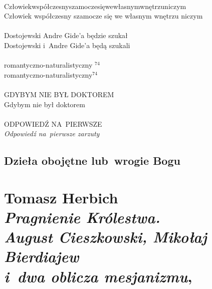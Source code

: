 \documentclass[a4paper,11pt]{article}
\numberwithin{equation}{section}
\begin{document}
\VerSpaceTwo


\noindent
{} \\
\Jest Człowiekwspółczesnyszamoczesięwewłasnymwnętrzuniczym \\
\PowinnoByc Człowiek współczesny szamocze się we własnym wnętrzu niczym \\
 \\
\Jest Dostojewski Andre Gide'a będzie szukał \\
\PowinnoByc Dostojewski i~Andre Gide'a będą szukali \\
 \\
\Jest romantyczno-naturalistyczny $^{ 74 }$ \\
\PowinnoByc romantyczno-naturalistyczny$^{ 74 }$ \\
 \\
\Jest G{\footnotesize DYBYM NIE BYŁ DOKTOREM} \\
\PowinnoByc Gdybym nie był doktorem \\
 \\
\Jest ODPOWIEDŹ NA~PIERWSZE \\
\PowinnoByc \textit{Odpowiedź na~pierwsze zarzuty} \\












\newpage

\subsection{Dzieła obojętne lub~wrogie Bogu}

\VerSpaceTwo



\section{Tomasz Herbich \\
  \textit{Pragnienie Królestwa.} \\
  \textit{August Cieszkowski, Mikołaj Bierdiajew} \\
  \textit{i~dwa oblicza mesjanizmu},
  \parencite{HerbichPragnienieKrolestwa2018}}
\end{document}
